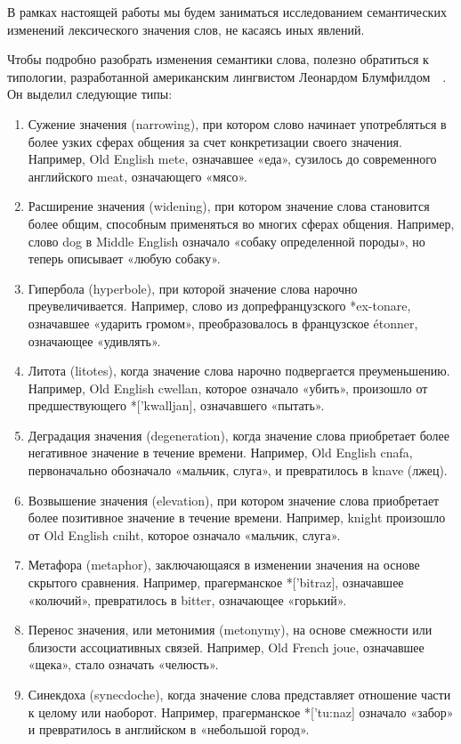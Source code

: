 \documentclass[LI,VKR]{HSEUniversity}
\begin{document}
В рамках настоящей работы мы будем заниматься исследованием семантических изменений
лексического значения слов, не касаясь иных явлений.

Чтобы подробно разобрать изменения семантики слова,
полезно обратиться к типологии,
разработанной американским лингвистом Леонардом Блумфилдом~~\cite{BloomfieldLanguage,
    Harris2014SemanticShifts}.
Он выделил следующие типы:

\begin{enumerate}
    \item Сужение значения (narrowing), при котором слово начинает употребляться
в более узких сферах общения за счет конкретизации своего значения.
Например, Old English mete, означавшее «еда», сузилось до современного английского meat,
означающего «мясо».
    \item Расширение значения (widening), при котором значение слова становится более общим,
способным применяться во многих сферах общения.
Например, слово dog в Middle English означало «собаку определенной породы»,
но теперь описывает «любую собаку».
    \item Гипербола (hyperbole), при которой значение слова нарочно преувеличивается.
Например, слово из допрефранцузского *ex-tonare, означавшее «ударить громом»,
преобразовалось в французское étonner, означающее «удивлять».
    \item Литота (litotes), когда значение слова нарочно подвергается преуменьшению.
Например, Old English cwellan, которое означало «убить», произошло от
предшествующего *['kwalljan], означавшего «пытать».
    \item Деградация значения (degeneration), когда значение слова приобретает
более негативное значение в течение времени.
Например, Old English cnafa, первоначально обозначало «мальчик, слуга», и превратилось в knave
(лжец).
    \item Возвышение значения (elevation), при котором значение слова приобретает
более позитивное значение в течение времени.
Например, knight произошло от Old English cniht, которое означало «мальчик, слуга».
    \item Метафора (metaphor), заключающаяся в изменении значения на основе скрытого сравнения.
Например, прагерманское *['bitraz], означавшее «колючий», превратилось в bitter,
означающее «горький».
    \item Перенос значения, или метонимия (metonymy), на основе смежности
или близости ассоциативных связей.
Например, Old French joue, означавшее «щека», стало означать «челюсть».
    \item Синекдоха (synecdoche), когда значение слова представляет отношение
части к целому или наоборот.
Например, прагерманское *['tu:naz] означало «забор» и превратилось в английском в «небольшой город».
\end{enumerate}
\end{document}
